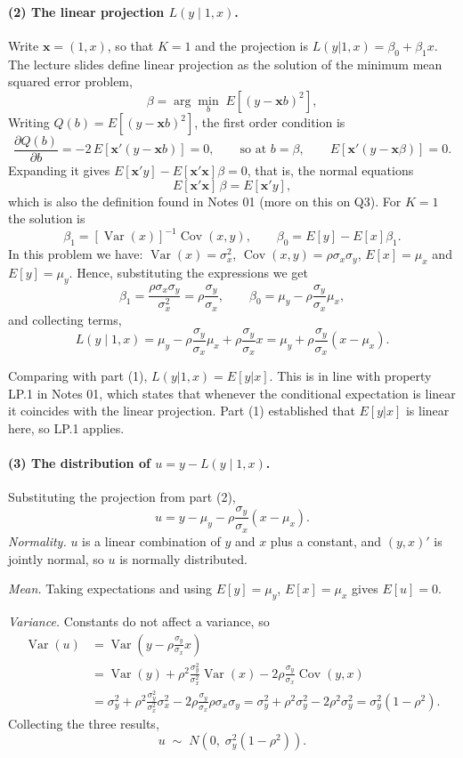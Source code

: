 \documentclass[11pt]{article}
\DeclareMathOperator{\Var}{Var}
\DeclareMathOperator{\Cov}{Cov}
\begin{document}
\paragraph{(2) The linear projection $L(y\mid 1,x)$.}
Write $\mathbf{x} = (1,x)$, so that $K=1$ and the projection is
$L(y|1,x) = \beta_0 + \beta_1 x$. The lecture slides define linear projection as
the solution of the minimum mean squared error problem,
\[
\beta = \arg\min_{b} \; E\!\left[\left(y - \mathbf{x}b\right)^2\right],
\]
Writing $Q(b) = E[(y-\mathbf{x}b)^2]$, the first order
condition is
\[
\frac{\partial Q(b)}{\partial b}
= -2\,E\!\left[\mathbf{x}'(y - \mathbf{x}b)\right] = 0,
\qquad\text{so at } b = \beta, \qquad
E\!\left[\mathbf{x}'(y - \mathbf{x}\beta)\right] = 0 .
\]
Expanding it gives
$E[\mathbf{x}'y] - E[\mathbf{x}'\mathbf{x}]\beta = 0$, that is, the normal
equations
\[
E[\mathbf{x}'\mathbf{x}]\,\beta = E[\mathbf{x}'y],
\]
which is also the definition found in Notes 01 (more on this on Q3). For $K = 1$ the solution is
\[
\beta_1 = \left[\Var(x)\right]^{-1}\Cov(x,y),
\qquad
\beta_0 = E[y] - E[x]\beta_1 .
\]
In this problem we have:
$\Var(x) = \sigma_x^2$, $\Cov(x,y) = \rho\sigma_x\sigma_y$, $E[x] = \mu_x$ and
$E[y] = \mu_y$. Hence, substituting the expressions we get
\[
\beta_1 = \frac{\rho\sigma_x\sigma_y}{\sigma_x^2}
= \rho\frac{\sigma_y}{\sigma_x},
\qquad
\beta_0 = \mu_y - \rho\frac{\sigma_y}{\sigma_x}\mu_x ,
\]
and collecting terms,
\[
L(y \mid 1,x) = \mu_y - \rho\frac{\sigma_y}{\sigma_x}\mu_x
+ \rho\frac{\sigma_y}{\sigma_x}x
= \mu_y + \rho\frac{\sigma_y}{\sigma_x}(x-\mu_x).
\]

Comparing with part (1), $L(y|1,x) = E[y|x]$. This is in line with property LP.1 in Notes 01, which states that whenever the conditional
expectation is linear it coincides with the linear projection. Part (1)
established that $E[y|x]$ is linear here, so LP.1 applies.

\paragraph{(3) The distribution of $u = y - L(y\mid 1,x)$.}
Substituting the projection from part (2),
\[
u = y - \mu_y - \rho\frac{\sigma_y}{\sigma_x}(x-\mu_x).
\]
\emph{Normality.} $u$ is a linear combination of $y$ and $x$ plus a constant,
and $(y,x)'$ is jointly normal, so $u$ is normally distributed.

\emph{Mean.} Taking expectations and using $E[y]=\mu_y$, $E[x]=\mu_x$ gives
$E[u] = 0$.

\emph{Variance.} Constants do not affect a variance, so
\begin{align*}
\Var(u)
&= \Var\!\left(y - \rho\frac{\sigma_y}{\sigma_x}x\right)\\
&= \Var(y)
 + \rho^2\frac{\sigma_y^2}{\sigma_x^2}\Var(x)
 - 2\rho\frac{\sigma_y}{\sigma_x}\Cov(y,x)\\
&= \sigma_y^2
 + \rho^2\frac{\sigma_y^2}{\sigma_x^2}\sigma_x^2
 - 2\rho\frac{\sigma_y}{\sigma_x}\rho\sigma_x\sigma_y
 = \sigma_y^2 + \rho^2\sigma_y^2 - 2\rho^2\sigma_y^2
 = \sigma_y^2(1-\rho^2).
\end{align*}
Collecting the three results,
\[
u \;\sim\; N\!\left(0,\; \sigma_y^2(1-\rho^2)\right).
\]
\end{document}
